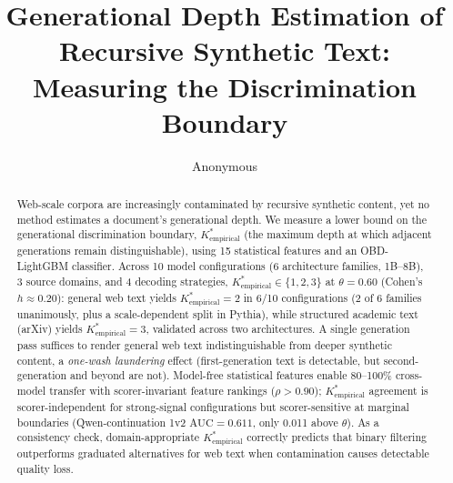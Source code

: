 \documentclass[11pt]{article}
\title{Generational Depth Estimation of Recursive Synthetic Text:\\Measuring the Discrimination Boundary}
\author{Anonymous}
\newcommand{\Kempirical}{{K^*_{\text{empirical}}}}
\newcommand{\auc}{\text{AUC}}
\begin{document}
\maketitle

\begin{abstract}
Web-scale corpora are increasingly contaminated by recursive synthetic content, yet no method estimates a document's generational depth.
We measure a lower bound on the generational discrimination boundary, $\Kempirical$ (the maximum depth at which adjacent generations remain distinguishable), using 15 statistical features and an OBD-LightGBM classifier.
Across 10 model configurations (6 architecture families, 1B--8B), 3 source domains, and 4 decoding strategies, $\Kempirical \in \{1, 2, 3\}$ at $\theta{=}0.60$ (Cohen's $h{\approx}0.20$): general web text yields $\Kempirical{=}2$ in 6/10 configurations (2 of 6 families unanimously, plus a scale-dependent split in Pythia), while structured academic text (arXiv) yields $\Kempirical{=}3$, validated across two architectures.
A single generation pass suffices to render general web text indistinguishable from deeper synthetic content, a \emph{one-wash laundering} effect (first-generation text is detectable, but second-generation and beyond are not).
Model-free statistical features enable 80--100\% cross-model transfer with scorer-invariant feature rankings ($\rho > 0.90$); $\Kempirical$ agreement is scorer-independent for strong-signal configurations but scorer-sensitive at marginal boundaries (Qwen-continuation 1v2 $\auc = 0.611$, only 0.011 above $\theta$).
As a consistency check, domain-appropriate $\Kempirical$ correctly predicts that binary filtering outperforms graduated alternatives for web text when contamination causes detectable quality loss.
\end{abstract}















\clearpage
\end{document}
